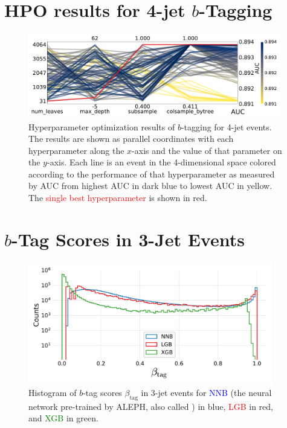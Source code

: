 \section[HPO results for 4-jet b-Tagging]{HPO results for 4-jet $b$-Tagging}
\begin{figure}
  \includegraphics[width=0.98\textwidth, trim=0 0 0 0, clip]{figures/quarks/CV_viz-njet=4-name=lf_lgb_down_sample=1.00-ML_vars=vertex-selection=b-ejet_min=4-n_iter_RS_lgb=99-n_iter_RS_xgb=9-cdot_cut=0.90-version=19.pdf}
  \caption[Parallel Coordinate Plot of HPO results for 4-Jet $b$-Tagging]
          {Hyperparameter optimization results of $b$-tagging for 4-jet events. The results are shown as parallel coordinates with each hyperparameter along the $x$-axis and the value of that parameter on the $y$-axis. Each line is an event in the 4-dimensional space colored according to the performance of that hyperparameter as measured by AUC from \textcolor{viridis-dark}{highest} AUC in dark blue to \textcolor{viridis-light}{lowest} AUC in yellow. The \textcolor{red}{single best hyperparameter} is shown in red. 
          } 
\end{figure}
\clearpage

\FloatBarrier
\section[b-Tag Scores in 3-Jet Events]{$b$-Tag Scores in 3-Jet Events}
\begin{figure}
  \includegraphics[width=0.95\textwidth, trim=0 0 0 30, clip]{figures/quarks/y_pred_3_jet_hist-down_sample=1.00-ML_vars=vertex-selection=b-ejet_min=4-n_iter_RS_lgb=99-n_iter_RS_xgb=9-cdot_cut=0.90-version=19.pdf}
  \caption[$b$-Tag Scores in 3-Jet Events]
          {Histogram of $b$-tag scores $\beta_\mathrm{tag}$ in 3-jet events for \textcolor{blue}{NNB} (the neural network pre-trained by ALEPH, also called ) in blue, \textcolor{red}{LGB} in red, and \textcolor{green}{XGB} in green. 
          } 
  \label{fig:q:btag_scores_3j}
\end{figure}
\vspace{2cm}

